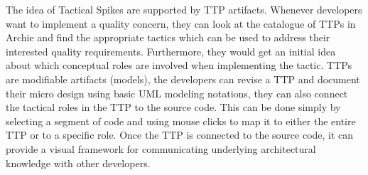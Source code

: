 The idea of Tactical Spikes are supported by TTP artifacts. Whenever developers want to implement a quality concern, they can look at the catalogue of TTPs in Archie and find the appropriate tactics which can be used to address their interested quality requirements. Furthermore, they would get an initial idea about which conceptual roles are involved when implementing the tactic. TTPs are modifiable artifacts (models), the developers can revise a TTP and document their micro design using basic UML modeling notations, they can also connect the tactical roles in the TTP to the source code. This can be done simply by selecting a segment of code and using mouse clicks to map it to either the entire TTP or to a specific role. Once the TTP is connected to the source code, it can provide a visual framework for communicating underlying architectural knowledge with other developers.
